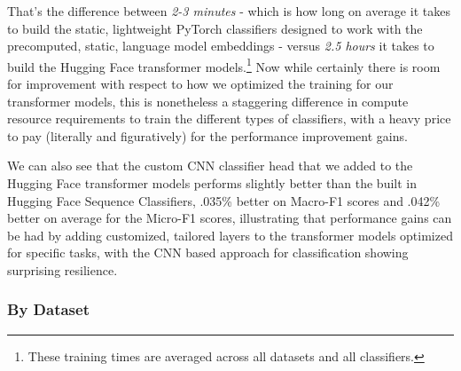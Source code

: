 \documentclass[final]{clv2025}
\begin{document}
That's the difference between \textit{2-3 minutes} - which is how long on average it takes to build the static, lightweight PyTorch classifiers designed to work with the precomputed, static, language model embeddings - versus \textit{2.5 hours} it takes to build the Hugging Face transformer models.\footnote{These training times are averaged across all datasets and all classifiers.} Now while certainly there is room for improvement with respect to how we optimized the training for our transformer models, this is nonetheless a staggering difference in compute resource requirements to train the different types of classifiers, with a heavy price to pay (literally and figuratively) for the performance improvement gains.

We can also see that the custom CNN classifier head that we added to the Hugging Face transformer models performs slightly better than the built in Hugging Face Sequence Classifiers, .035\% better on Macro-F1 scores and .042\% better on average for the Micro-F1 scores, illustrating that performance gains can be had by adding customized, tailored layers to the transformer models optimized for specific tasks, with the CNN based approach for classification showing surprising resilience.

\subsubsection{By Dataset}
\end{document}
